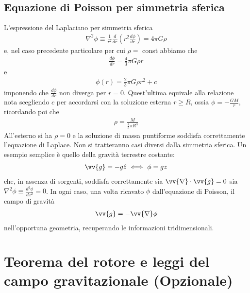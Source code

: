 \documentclass[a4paper, oneside]{book}
\begin{document}
\subsection{Equazione di Poisson per simmetria sferica}
L'espressione del Laplaciano per simmetria sferica
\begin{align}
    \nabla^{2}\phi \equiv \frac{1}{r^{2}} \frac{d}{dr} \left(r^{2} \frac{d\phi}{dr}\right) = 4\pi G\rho
\end{align}
e, nel caso precedente particolare per cui $\rho =$ const abbiamo che 
\begin{gather*}
    \frac{d\phi}{dr} = \frac{4}{3}\pi G \rho r
\end{gather*}
e 
\begin{gather*}
    \phi(r) = \frac{2}{3}\pi G \rho r^{2} + c
\end{gather*}
imponendo che $\frac{d\phi}{dr}$ non diverga per $r = 0$. Quest'ultima
equivale alla relazione nota scegliendo $c$ per accordarsi con la soluzione 
esterna $r \geq R$, ossia $\phi = -\frac{GM}{r}$, ricordando
poi che
\begin{gather*}
    \rho = \frac{M}{\frac{4}{3}\pi R^{3}}
\end{gather*}
All'esterno si ha $\rho = 0 $ e la soluzione di massa puntiforme soddisfa correttamente 
l'equazione di Laplace. Non si tratteranno casi diversi dalla simmetria sferica. Un esempio semplice 
è quello della gravità terrestre costante: 
\begin{gather*}
    \vv{g} = -g\hat{z} \  \Longleftrightarrow  \ \phi = gz
\end{gather*}
che, in assenza di sorgenti, soddisfa correttamente sia 
$\vv{\nabla} \cdot \vv{g} = 0$ sia $\nabla^{2}\phi \equiv \frac{d^{2}\phi}{dz^{2}} = 0$. 
In ogni caso, una volta ricavato $\phi$ dall'equazione di Poisson, il campo di gravità
\begin{gather*}
    \vv{g} = -\vv{\nabla}\phi  
\end{gather*}  
nell'opportuna geometria, recuperando le informazioni tridimensionali.


\section{Teorema del rotore e leggi del campo gravitazionale (Opzionale)}
\end{document}
